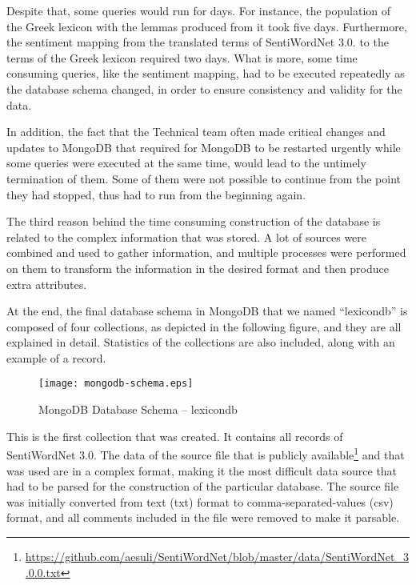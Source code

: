 Despite that, some queries would run for days.
For instance, the population of the Greek lexicon with the lemmas
produced from it took five days.
Furthermore, the sentiment mapping from the translated terms
of SentiWordNet 3.0. to the terms of the Greek lexicon
required two days.
What is more, some time consuming queries, like the sentiment mapping,
had to be executed repeatedly as the database schema changed,
in order to ensure consistency and validity for the data.

In addition,
the fact that the Technical team often made critical changes and updates
to MongoDB that required for MongoDB to be restarted urgently
while some queries were executed at the same time,
would lead to the untimely termination of them.
Some of them were not possible to continue
from the point they had stopped,
thus had to run from the beginning again.

The third reason behind the time consuming construction of the database
is related to the complex information that was stored.
A lot of sources were combined and used to gather information,
and multiple processes were performed on them
to transform the information in the desired format
and then produce extra attributes.

At the end, the final database schema in MongoDB
that we named ``lexicondb''
is composed of four collections,
as depicted in the following figure,
and they are all explained in detail.
Statistics of the collections are also included,
along with an example of a record.

\begin{figure}[ht]
\centering
\texttt{[image: mongodb-schema.eps]}
\caption{MongoDB Database Schema -- lexicondb}
\label{fig:mongodb-schema}
\end{figure}

\clearpage

\label{subsubsubsec:swn-v3}

This is the first collection that was created.
It contains all records of SentiWordNet 3.0.
The data of the source file that is publicly available\footnote{\url {https://github.com/aesuli/SentiWordNet/blob/master/data/SentiWordNet_3.0.0.txt}}
and that was used are in a complex format,
making it the most difficult data source that had to be parsed
for the construction of the particular database.
The source file was initially converted
from text (txt) format to comma-separated-values (csv) format,
and all comments included in the file were removed
to make it parsable.

